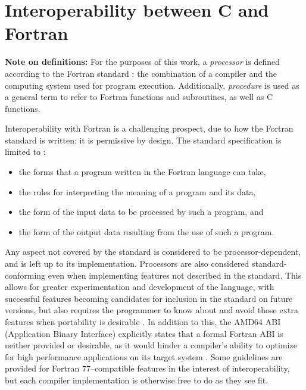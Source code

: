 \chapter{Interoperability between C and Fortran}
\label{chapter:interoperability}

\textbf{Note on definitions:} For the purposes of this work, a \textit{processor} is defined according to the Fortran standard \cite{adams2008fortran}: the combination of a compiler and the computing system used for program execution. Additionally, \textit{procedure} is used as a general term to refer to Fortran functions and subroutines, as well as C functions.

Interoperability with Fortran is a challenging prospect, due to how the Fortran standard is written: it is permissive by design. The standard specification is limited to \cite{F90standard,F2003standard,F2018standard}: 

\begin{itemize}
	\item the forms that a program written in the Fortran language can take,
	\item the rules for interpreting the meaning of a program and its data,
	\item the form of the input data to be processed by such a program, and
	\item the form of the output data resulting from the use of such a program.
\end{itemize}

Any aspect not covered by the standard is considered to be processor-dependent, and is left up to its implementation. Processors are also considered standard-conforming even when implementing features not described in the standard. This allows for greater experimentation and development of the language, with successful features becoming candidates for inclusion in the standard on future versions, but also requires the programmer to know about and avoid those extra features when portability is desirable \cite{adams2008fortran}. In addition to this, the AMD64 ABI (Application Binary Interface) explicitly states that a formal Fortran ABI is neither provided or desirable, as it would hinder a compiler's ability to optimize for high performance applications on its target system \cite{x86_64_abi}. Some guidelines are provided for Fortran 77--compatible features in the interest of interoperability, but each compiler implementation is otherwise free to do as they see fit.

